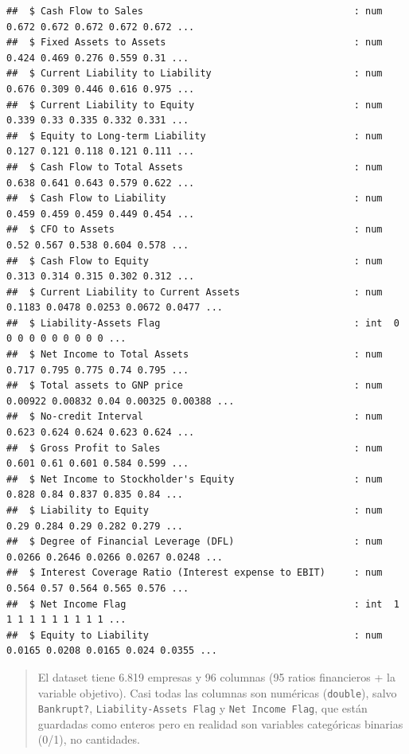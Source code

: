 \documentclass[
]{book}
\begin{document}
\begin{verbatim}
##  $ Cash Flow to Sales                                     : num  0.672 0.672 0.672 0.672 0.672 ...
##  $ Fixed Assets to Assets                                 : num  0.424 0.469 0.276 0.559 0.31 ...
##  $ Current Liability to Liability                         : num  0.676 0.309 0.446 0.616 0.975 ...
##  $ Current Liability to Equity                            : num  0.339 0.33 0.335 0.332 0.331 ...
##  $ Equity to Long-term Liability                          : num  0.127 0.121 0.118 0.121 0.111 ...
##  $ Cash Flow to Total Assets                              : num  0.638 0.641 0.643 0.579 0.622 ...
##  $ Cash Flow to Liability                                 : num  0.459 0.459 0.459 0.449 0.454 ...
##  $ CFO to Assets                                          : num  0.52 0.567 0.538 0.604 0.578 ...
##  $ Cash Flow to Equity                                    : num  0.313 0.314 0.315 0.302 0.312 ...
##  $ Current Liability to Current Assets                    : num  0.1183 0.0478 0.0253 0.0672 0.0477 ...
##  $ Liability-Assets Flag                                  : int  0 0 0 0 0 0 0 0 0 0 ...
##  $ Net Income to Total Assets                             : num  0.717 0.795 0.775 0.74 0.795 ...
##  $ Total assets to GNP price                              : num  0.00922 0.00832 0.04 0.00325 0.00388 ...
##  $ No-credit Interval                                     : num  0.623 0.624 0.624 0.623 0.624 ...
##  $ Gross Profit to Sales                                  : num  0.601 0.61 0.601 0.584 0.599 ...
##  $ Net Income to Stockholder's Equity                     : num  0.828 0.84 0.837 0.835 0.84 ...
##  $ Liability to Equity                                    : num  0.29 0.284 0.29 0.282 0.279 ...
##  $ Degree of Financial Leverage (DFL)                     : num  0.0266 0.2646 0.0266 0.0267 0.0248 ...
##  $ Interest Coverage Ratio (Interest expense to EBIT)     : num  0.564 0.57 0.564 0.565 0.576 ...
##  $ Net Income Flag                                        : int  1 1 1 1 1 1 1 1 1 1 ...
##  $ Equity to Liability                                    : num  0.0165 0.0208 0.0165 0.024 0.0355 ...
\end{verbatim}

\begin{quote}
El dataset tiene 6.819 empresas y 96 columnas (95 ratios financieros + la variable
objetivo). Casi todas las columnas son numéricas (\texttt{double}), salvo \texttt{Bankrupt?},
\texttt{Liability-Assets\ Flag} y \texttt{Net\ Income\ Flag}, que están guardadas como enteros pero
en realidad son variables categóricas binarias (0/1), no cantidades.
\end{quote}
\end{document}
